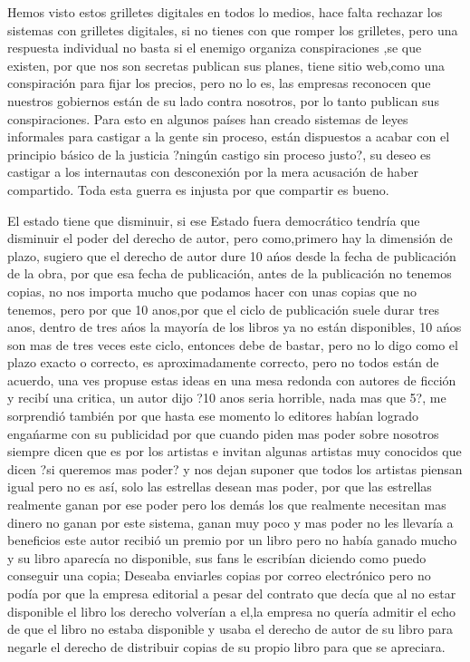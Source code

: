 \begin{multicols}{2}
Hemos visto estos grilletes digitales en todos lo medios, hace falta rechazar  los sistemas con grilletes digitales, si no tienes con que romper los grilletes, pero una respuesta individual no basta si el enemigo organiza conspiraciones ,se que existen, por que nos son secretas publican sus planes, tiene sitio web,{\em {\color{introcolor}{ una conspiración para impedir el acceso a la tecnología debería ser un delito grave }}}como una conspiración para fijar los precios, pero no lo es, las empresas reconocen que nuestros gobiernos están de su lado contra nosotros, por lo tanto publican sus conspiraciones. Para esto en algunos países han creado sistemas de leyes  informales para castigar a la gente sin proceso, están dispuestos a acabar con el principio básico de la justicia ?ningún castigo sin proceso justo?, su deseo es castigar a los internautas con desconexión por la mera acusación de haber compartido.{\em {\color{introcolor}{ Quieren imponernos un sistema de opresión para mantener su dinero. }}} Toda esta guerra es injusta por que compartir es bueno.

El estado tiene que disminuir, si ese Estado fuera democrático tendría que disminuir el poder del derecho de autor, pero como,primero hay la dimensión de plazo, sugiero que el derecho de autor dure 10 ańos desde la fecha de publicación de la obra, por que esa fecha de publicación, antes de la publicación no tenemos copias, no nos importa mucho que podamos hacer con unas copias que no tenemos, pero por que 10 anos,por que el ciclo de publicación suele durar tres anos, dentro de tres ańos la mayoría de los libros ya no están disponibles, 10  ańos son mas de tres veces este ciclo, entonces debe de bastar, pero no lo digo como el plazo exacto o correcto, es aproximadamente correcto, pero no todos están de acuerdo, una ves propuse estas ideas en una mesa redonda con autores de ficción y recibí una critica, un autor dijo ?10 anos seria horrible, nada mas que 5?, me sorprendió también por que hasta ese momento lo editores habían logrado engańarme con su publicidad por que cuando piden mas poder sobre nosotros siempre dicen que es por los artistas e invitan algunas artistas muy conocidos que dicen ?si queremos mas poder? y nos dejan suponer que todos los artistas piensan igual pero no es así, solo las estrellas desean mas poder, por que las estrellas realmente ganan por ese poder pero los demás los que realmente necesitan mas dinero no ganan por este sistema, ganan muy poco y mas poder no les llevaría a beneficios este autor recibió un premio por un libro pero no había ganado mucho y su libro aparecía no disponible, sus fans le escribían diciendo como puedo conseguir una copia; Deseaba enviarles copias por correo electrónico pero no podía por que la empresa editorial a pesar del contrato que decía que al no estar disponible el libro los derecho volverían a el,la  empresa no quería admitir el echo de que el libro no estaba disponible y usaba el derecho de autor de su libro para negarle el derecho de distribuir copias de su propio libro para que se apreciara. 


\end{multicols}
